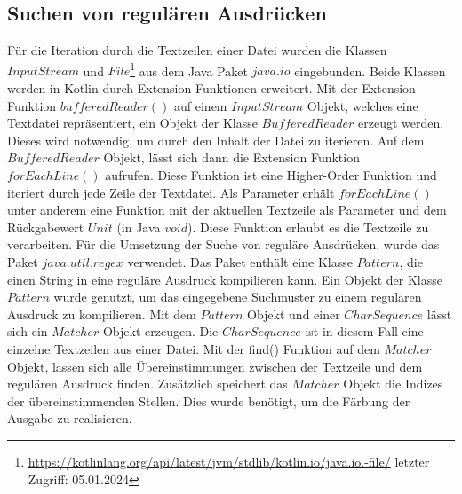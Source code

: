 \documentclass{article}
\begin{document}
\subsection{Suchen von regulären Ausdrücken}
Für die Iteration durch die Textzeilen einer Datei wurden die Klassen $InputStream$ und $File$\footnote{\url{https://kotlinlang.org/api/latest/jvm/stdlib/kotlin.io/java.io.-file/} letzter Zugriff: 05.01.2024} aus dem Java Paket $java.io$ eingebunden. Beide Klassen werden in Kotlin durch Extension Funktionen erweitert. Mit der Extension Funktion $bufferedReader()$ auf einem $InputStream$ Objekt, welches eine Textdatei repräsentiert, ein Objekt der Klasse $BufferedReader$ erzeugt werden. Dieses wird notwendig, um durch den Inhalt der Datei zu iterieren. Auf dem $BufferedReader$ Objekt, lässt sich dann die Extension Funktion $forEachLine()$ aufrufen. Diese Funktion ist eine Higher-Order Funktion und iteriert durch jede Zeile der Textdatei. Als Parameter erhält $forEachLine()$ unter anderem eine Funktion mit der aktuellen Textzeile als Parameter und dem Rückgabewert $Unit$ (in Java $void$). Diese Funktion erlaubt es die Textzeile zu verarbeiten. \newline
Für die Umsetzung der Suche von reguläre Ausdrücken, wurde das Paket $java.util.regex$ verwendet. Das Paket enthält eine Klasse $Pattern$, die einen String in eine reguläre Ausdruck kompilieren kann. Ein Objekt der Klasse $Pattern$ wurde genutzt, um das eingegebene Suchmuster zu einem regulären Ausdruck zu kompilieren. Mit dem $Pattern$ Objekt und einer $CharSequence$ lässt sich ein $Matcher$ Objekt erzeugen. Die $CharSequence$ ist in diesem Fall eine einzelne Textzeilen aus einer Datei. Mit der find() Funktion auf dem $Matcher$ Objekt, lassen sich alle Übereinstimmungen zwischen der Textzeile und dem regulären Ausdruck finden. Zusätzlich speichert das $Matcher$ Objekt die Indizes der übereinstimmenden Stellen. Dies wurde benötigt, um die Färbung der Ausgabe zu realisieren.
\end{document}
